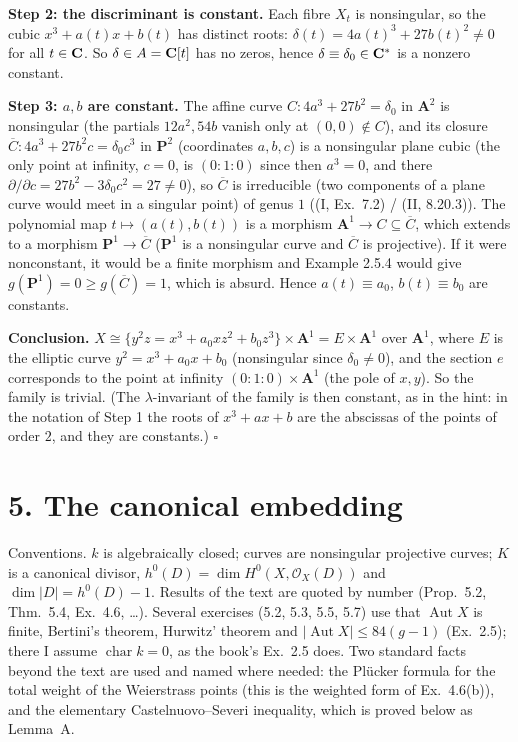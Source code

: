 \documentclass[11pt]{article}
\begin{document}
\textbf{Step 2: the discriminant is constant.} Each fibre $X_t$ is nonsingular, so the cubic $x^3+a(t)x+b(t)$ has distinct roots: $\delta(t)=4a(t)^3+27b(t)^2\ne0$ for all $t\in\mathbf C$. So $\delta\in A=\mathbf C[t]$ has no zeros, hence $\delta\equiv\delta_0\in\mathbf C^*$ is a nonzero constant.

\textbf{Step 3: $a,b$ are constant.} The affine curve $C:4a^3+27b^2=\delta_0$ in $\mathbf A^2$ is nonsingular (the partials $12a^2,54b$ vanish only at $(0,0)\notin C$), and its closure $\overline C:4a^3+27b^2c=\delta_0c^3$ in $\mathbf P^2$ (coordinates $a,b,c$) is a nonsingular plane cubic (the only point at infinity, $c=0$, is $(0:1:0)$ since then $a^3=0$, and there $\partial/\partial c=27b^2-3\delta_0c^2=27\ne0$), so $\overline C$ is irreducible (two components of a plane curve would meet in a singular point) of genus $1$ ((I, Ex.~7.2) / (II, 8.20.3)). The polynomial map $t\mapsto(a(t),b(t))$ is a morphism $\mathbf A^1\to C\subseteq\overline C$, which extends to a morphism $\mathbf P^1\to\overline C$ ($\mathbf P^1$ is a nonsingular curve and $\overline C$ is projective). If it were nonconstant, it would be a finite morphism and Example 2.5.4 would give $g(\mathbf P^1)=0\ge g(\overline C)=1$, which is absurd. Hence $a(t)\equiv a_0$, $b(t)\equiv b_0$ are constants.

\textbf{Conclusion.} $X\cong\{y^2z=x^3+a_0xz^2+b_0z^3\}\times\mathbf A^1=E\times\mathbf A^1$ over $\mathbf A^1$, where $E$ is the elliptic curve $y^2=x^3+a_0x+b_0$ (nonsingular since $\delta_0\neq0$), and the section $e$ corresponds to the point at infinity $(0:1:0)\times\mathbf A^1$ (the pole of $x,y$). So the family is trivial. (The $\lambda$-invariant of the family is then constant, as in the hint: in the notation of Step 1 the roots of $x^3+ax+b$ are the abscissas of the points of order $2$, and they are constants.) \hfill$\square$

\section*{5. The canonical embedding}

Conventions. $k$ is algebraically closed; curves are nonsingular projective curves; $K$ is a canonical divisor, $h^0(D)=\dim H^0(X,\mathcal O_X(D))$ and $\dim|D|=h^0(D)-1$. Results of the text are quoted by number (Prop.~5.2, Thm.~5.4, Ex.~4.6, \dots). Several exercises (5.2, 5.3, 5.5, 5.7) use that $\operatorname{Aut}X$ is finite, Bertini's theorem, Hurwitz' theorem and $|\operatorname{Aut}X|\le 84(g-1)$ (Ex.~2.5); there I assume $\operatorname{char}k=0$, as the book's Ex.~2.5 does. Two standard facts beyond the text are used and named where needed: the Plücker formula for the total weight of the Weierstrass points (this is the weighted form of Ex.~4.6(b)), and the elementary Castelnuovo--Severi inequality, which is proved below as Lemma~A.
\end{document}
